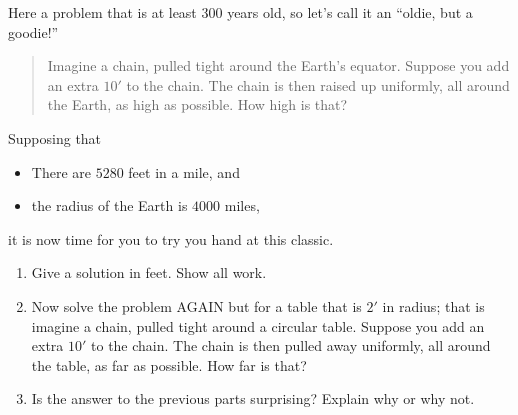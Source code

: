 \documentclass[noauthor,hints,nooutcomes,handout]{ximera}
\begin{document}
\begin{question} %
  Here a problem that is at least $300$ years old, so let's call it an  ``oldie, but a goodie!''
  \begin{quote}
    Imagine a chain, pulled tight around the Earth's equator. Suppose
    you add an extra $10'$ to the chain. The chain is then raised up
    uniformly, all around the Earth, as high as possible. How high is
    that?
  \end{quote}
  Supposing that
  \begin{itemize}
  \item There are $5280$ feet in a mile, and
  \item the radius of the Earth is $4000$ miles,
  \end{itemize}
  it is now time for you to try you hand at this classic.
  \begin{enumerate}
  \item Give a solution in feet. Show all work.
  \item Now solve the problem AGAIN but for a table that is $2'$ in
    radius; that is imagine a chain, pulled tight around a circular
    table. Suppose you add an extra $10'$ to the chain. The chain is
    then pulled away uniformly, all around the table, as far as
    possible. How far is that?
  \item Is the answer to the previous parts surprising? Explain why or
    why not.
  \end{enumerate}
\end{question}
\end{document}
